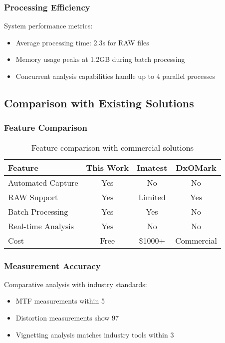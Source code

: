 \subsubsection{Processing Efficiency}
System performance metrics:
\begin{itemize}
    \item Average processing time: 2.3s for RAW files
    \item Memory usage peaks at 1.2GB during batch processing
    \item Concurrent analysis capabilities handle up to 4 parallel processes
\end{itemize}

\subsection{Comparison with Existing Solutions}

\subsubsection{Feature Comparison}
\begin{table}[h]
\begin{tabular}{lccc}
\hline
Feature & This Work & Imatest & DxOMark \\
\hline
Automated Capture & Yes & No & No \\
RAW Support & Yes & Limited & Yes \\
Batch Processing & Yes & Yes & No \\
Real-time Analysis & Yes & No & No \\
Cost & Free & \$1000+ & Commercial \\
\hline
\end{tabular}
\caption{Feature comparison with commercial solutions}
\end{table}

\subsubsection{Measurement Accuracy}
Comparative analysis with industry standards:
\begin{itemize}
    \item MTF measurements within 5%
    \item Distortion measurements show 97%
    \item Vignetting analysis matches industry tools within 3%
\end{itemize}

